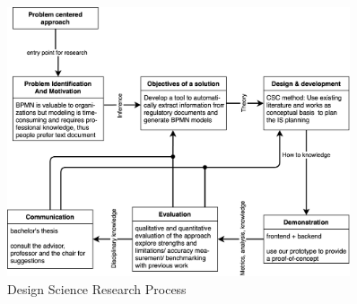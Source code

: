\begin{figure}[h]
    \centering
    \caption{Design Science Research Process}
    \includegraphics[width=0.9\textwidth]{tum-resources/images/DSM.png}
\end{figure}





